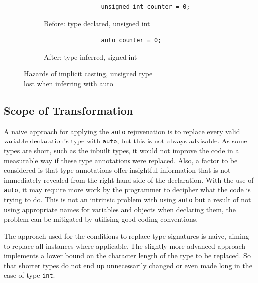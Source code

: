 \documentclass[bsc,frontabs,singlespacing,twoside,parskip,deptreport]{infthesis}
\begin{document}
\begin{figure}[!h]
    \centering
    \begin{subfigure}[h]{\textwidth}
        \centering
        \begin{verbatim}
                unsigned int counter = 0;
        \end{verbatim}
        \caption{Before: type declared, unsigned int}
        \label{fig:implicit-cast-before}
        \vspace{0.40cm}
    \end{subfigure}
    \begin{subfigure}[h]{\textwidth}
        \centering
        \begin{verbatim}
                auto counter = 0; 
        \end{verbatim}
        \caption{After: type inferred, signed int}
        \label{fig:implicit-cast-after}
    \end{subfigure}
    \caption{Hazards of implicit casting, unsigned type \\ lost when inferring with auto}
    \label{fig:implicit-cast}
\end{figure}

\subsection{Scope of Transformation}\label{sec:auto-scop-trans}
A naive approach for applying the \texttt{auto} rejuvenation is to replace every valid variable declaration's type with \texttt{auto}, but this is not always advisable. As some types are short, such as the inbuilt types, it would not improve the code in a measurable way if these type annotations were replaced. Also, a factor to be considered is that type annotations offer insightful information that is not immediately revealed from the right-hand side of the declaration. With the use of \texttt{auto}, it may require more work by the programmer to decipher what the code is trying to do. This is not an intrinsic problem with using \texttt{auto} but a result of not using appropriate names for variables and objects when declaring them, the problem can be mitigated by utilising good coding conventions. 

The approach used for the conditions to replace type signatures is naive, aiming to replace all instances where applicable. The slightly more advanced approach implements a lower bound on the character length of the type to be replaced. So that shorter types do not end up unnecessarily changed or even made long in the case of type \texttt{int}.
\end{document}
